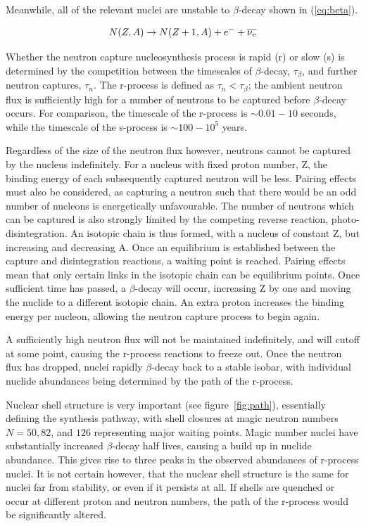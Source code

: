 \documentclass[a4paper,12pt]{article}
\begin{document}
Meanwhile, all of the relevant nuclei are unstable to $\beta$-decay shown in (\ref{eq:beta}).

\begin{equation}
\label{eq:beta}
N(Z, A) \rightarrow N(Z+1, A) + e^{-} + \overline{\nu\textsubscript{e}}
\end{equation}

Whether the neutron capture nucleosynthesis process is rapid (r) or slow (s) is determined by the competition between the timescales of $\beta$-decay, $\tau_{\beta}$, and further neutron captures, $\tau_{n}$. The r-process is defined as $\tau_{n}<\tau_{\beta}$; the ambient neutron flux is sufficiently high for a number of neutrons to be captured before $\beta$-decay occurs. For comparison, the timescale of the r-process is $\sim 0.01 - 10$ seconds, while the timescale of the s-process is $\sim 100 - 10^5$ years\cite{b2fh}{}.

Regardless of the size of the neutron flux however, neutrons cannot be captured by the nucleus indefinitely. For a nucleus with fixed proton number, Z, the binding energy of each subsequently captured neutron will be less. Pairing effects must also be considered, as capturing a neutron such that there would be an odd number of nucleons is energetically unfavourable\cite{b2fh}{}. The number of neutrons which can be captured is also strongly limited by the competing reverse reaction, photo-disintegration. An isotopic chain is thus formed, with a nucleus of constant Z, but increasing and decreasing A. Once an equilibrium is established between the capture and disintegration reactions, a waiting point is reached. Pairing effects mean that only certain links in the isotopic chain can be equilibrium points. Once sufficient time has passed, a $\beta$-decay will occur, increasing Z by one and moving the nuclide to a different isotopic chain. An extra proton increases the binding energy per nucleon, allowing the neutron capture process to begin again.

A sufficiently high neutron flux will not be maintained indefinitely, and will cutoff at some point, causing the r-process reactions to freeze out. Once the neutron flux has dropped, nuclei rapidly $\beta$-decay back to a stable isobar, with individual nuclide abundances being determined by the path of the r-process.

Nuclear shell structure is very important (see figure~\ref{fig:path}), essentially defining the synthesis pathway, with shell closures at magic neutron numbers $N=50,82$, and $126$ representing major waiting points. Magic number nuclei have substantially increased $\beta$-decay half lives\cite{iliadis}{}, causing a build up in nuclide abundance. This gives rise to three peaks in the observed abundances of r-process nuclei\cite{b2fh}{}. It is not certain however, that the nuclear shell structure is the same for nuclei far from stability, or even if it persists at all\cite{warner}{}. If shells are quenched or occur at different proton and neutron numbers, the path of the r-process would be significantly altered.
\end{document}
